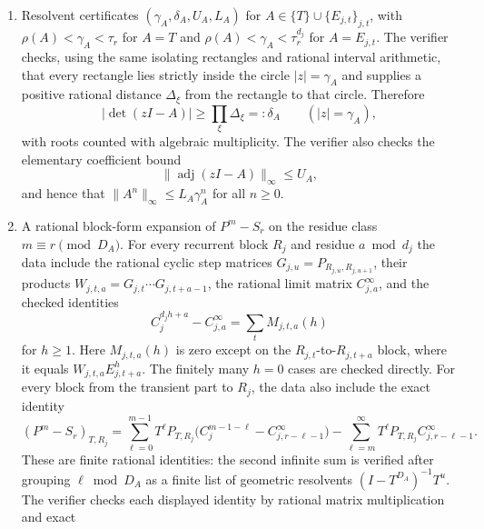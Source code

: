 \begin{theorem}
\begin{enumerate}[label=\textup{(\roman*)}]
    polynomial: rational rectangles, each containing exactly one complex
    root and disjoint from the others, whose squared-modulus intervals
    certify \(\rho(T)<\tau_r\) and
    \(\rho(E_{j,t})<\tau_r^{d_j}\). The verifier checks these by
    Sturm--subdivision or any equivalent exact rational root-counting
    procedure on the rectangles and by rational interval arithmetic for
    the squared moduli.
    \item Resolvent certificates
    \((\gamma_A,\delta_A,U_A,L_A)\) for
    \(A\in\{T\}\cup\{E_{j,t}\}_{j,t}\), with
    \(\rho(A)<\gamma_A<\tau_r\) for \(A=T\) and
    \(\rho(A)<\gamma_A<\tau_r^{d_j}\) for \(A=E_{j,t}\). The verifier
    checks, using the same isolating rectangles and rational interval
    arithmetic, that every rectangle lies strictly inside the circle
    \(|z|=\gamma_A\) and supplies a positive rational distance
    \(\Delta_\xi\) from the rectangle to that circle. Therefore
    \[
      |\det(zI-A)|\ge \prod_{\xi}\Delta_\xi=:\delta_A
      \qquad(|z|=\gamma_A),
    \]
    with roots counted with algebraic multiplicity. The verifier also
    checks the elementary coefficient bound
    \[
      \|\operatorname{adj}(zI-A)\|_\infty\le U_A,
    \]
    and hence that \(\|A^n\|_\infty\le L_A\gamma_A^n\) for all
    \(n\ge0\).
    \item A rational block-form expansion of \(P^m-S_r\) on the residue
    class \(m\equiv r\pmod {D_A}\). For every recurrent block \(R_j\)
    and residue \(a\bmod d_j\) the data include the rational cyclic step
    matrices \(G_{j,u}=P_{R_{j,u},R_{j,u+1}}\), their products
    \(W_{j,t,a}=G_{j,t}\cdots G_{j,t+a-1}\), the rational limit matrix
    \(C_{j,a}^{\infty}\), and the checked identities
    \[
      C_j^{d_jh+a}-C_{j,a}^{\infty}
      =
      \sum_t M_{j,t,a}(h)
    \]
    for \(h\ge1\). Here \(M_{j,t,a}(h)\) is zero except on the
    \(R_{j,t}\)-to-\(R_{j,t+a}\) block, where it equals
    \(W_{j,t,a}E_{j,t+a}^h\). The finitely many \(h=0\) cases are
    checked directly. For every block from the transient part to \(R_j\),
    the data also include the exact identity
    \[
      (P^m-S_r)_{T,R_j}
      =
      \sum_{\ell=0}^{m-1}
        T^\ell P_{T,R_j}
        \bigl(C_j^{m-1-\ell}-C_{j,r-\ell-1}^{\infty}\bigr)
      -
      \sum_{\ell=m}^{\infty}
        T^\ell P_{T,R_j}C_{j,r-\ell-1}^{\infty}.
    \]
    These are finite rational identities: the second infinite sum is
    verified after grouping \(\ell\bmod D_A\) as a finite list of
    geometric resolvents \((I-T^{D_A})^{-1}T^u\). The verifier checks
    each displayed identity by rational matrix multiplication and exact

\end{enumerate}
\end{theorem}
